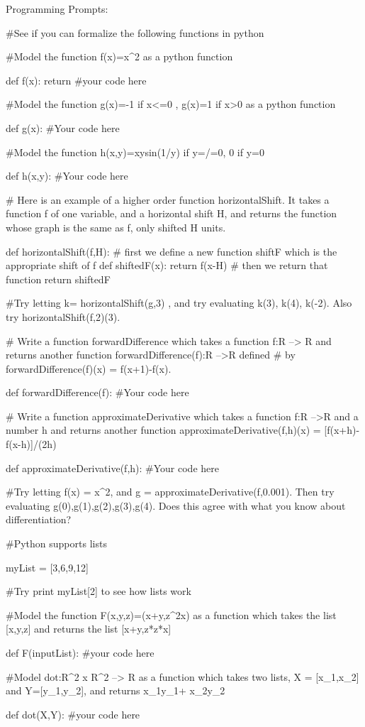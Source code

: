 Programming Prompts:

#See if you can formalize the following functions in python

#Model the function f(x)=x^2 as a python function

def f(x):
	return #your code here
	
#Model the function g(x)=-1 if x<=0 , g(x)=1 if x>0 as a python function

def g(x):
	#Your code here
	
#Model the function h(x,y)=xysin(1/y) if y=/=0, 0 if y=0

def h(x,y):
	#Your code here
	
# Here is an example of a higher order function horizontalShift.  It takes a function f of one variable, and a horizontal shift H, and returns the function whose graph is the same as f, only shifted H units.

def horizontalShift(f,H):
	# first we define a new function shiftF which is the appropriate shift of f
	def shiftedF(x):  
		return f(x-H) 
	# then we return that function
	return shiftedF

#Try  letting  k= horizontalShift(g,3) 	, and try evaluating k(3), k(4), k(-2).  Also try horizontalShift(f,2)(3).

# Write a function forwardDifference which takes a function f:R --> R and returns another function forwardDifference(f):R -->R defined 
# by forwardDifference(f)(x) = f(x+1)-f(x).

def forwardDifference(f):
	#Your code here
	
# Write a function approximateDerivative which takes a function f:R -->R  and a number h and returns another function approximateDerivative(f,h)(x) = [f(x+h)-f(x-h)]/(2h)

def approximateDerivative(f,h):
	#Your code here
	
#Try letting f(x) = x^2, and g = approximateDerivative(f,0.001).  Then try evaluating g(0),g(1),g(2),g(3),g(4).  Does this agree with what you know about differentiation?

#Python supports lists

	myList = [3,6,9,12]

#Try print myList[2] to see how lists work

#Model the function F(x,y,z)=(x+y,z^2x) as a function which takes the list [x,y,z] and returns the list [x+y,z*z*x]

def F(inputList):
	#your code here
	
#Model dot:R^2 x R^2 --> R as a function which takes two lists, X = [x_1,x_2] and Y=[y_1,y_2], and returns x_1y_1+ x_2y_2

def dot(X,Y):
	#your code here
	




